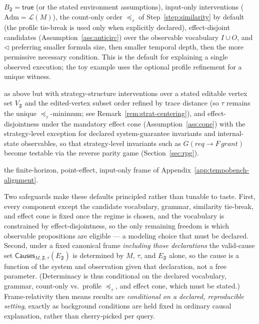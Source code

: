 \documentclass[11pt]{article}
\theoremstyle{remark}
\newcommand{\Lang}{\mathcal{L}}
\newcommand{\True}{\mathsf{true}}
\newcommand{\Frame}{\mathfrak{F}}
\newcommand{\Adm}{\mathrm{Adm}}
\begin{document}
\begin{description}[leftmargin=2.4cm,style=nextline]
  \item[Standard trace causality \(\Frame_{\mathrm{trace}}\)]
  \(B_{\Frame}=\True\) (or the stated environment assumptions), input-only
  interventions (\(\Adm=\Lang(M)\)), the count-only order
  \(\preceq_\tau\) of Step~\ref{step:similarity} by default (the profile tie-break
  is used only when explicitly declared), effect-disjoint candidates
  (Assumption~\ref{ass:anticirc}) over the observable vocabulary \(I\cup O\), and
  \(\triangleleft\) preferring smaller formula size, then smaller temporal depth,
  then the more permissive necessary condition. This is the default for explaining
  a single observed execution; the toy example uses the optional profile refinement
  for a unique witness.
  \item[Standard strategy causality \(\Frame_{\mathrm{strat}}\)]
  as above but with strategy-structure interventions over a stated editable
  vertex set \(V_{\Frame}\) and the edited-vertex subset order refined by trace
  distance (so \(\tau\) remains the unique \(\preceq_\tau\)-minimum; see
  Remark~\ref{rem:strat-centering}), and effect-disjointness under the mandatory
  effect cone (Assumption~\ref{ass:cone}) with the strategy-level exception for
  declared system-guarantee invariants and internal-state observables, so that
  strategy-level invariants
  such as \(G(req\rightarrow F\,grant)\) become testable via the reverse parity
  game (Section~\ref{sec:rpg}).
  \item[TempoBench-style \(\Frame_{\mathrm{TB}}\)]
  the finite-horizon, point-effect, input-only frame of
  Appendix~\ref{app:tempobench-alignment}.
\end{description}

Two safeguards make these defaults principled rather than tunable to taste.
First, every component except the candidate vocabulary, grammar, similarity
tie-break, and effect cone is fixed once the regime
is chosen, and the vocabulary is constrained by effect-disjointness, so the only
remaining freedom is which observable propositions are eligible --- a modeling
choice that must be declared. Second, under a fixed canonical frame \emph{including
those declarations} the valid-cause
set \(\mathsf{Causes}_{M,\Frame,\tau}(E_{\Frame})\) is determined by \(M\),
\(\tau\), and \(E_{\Frame}\) alone, so the cause is a function of the system and
observation given that declaration, not a free parameter. (Determinacy is thus
conditional on the declared vocabulary, grammar, count-only vs.\ profile
\(\preceq_\tau\), and effect cone, which must be stated.) Frame-relativity then means results are
\emph{conditional on a declared, reproducible setting}, exactly as background
conditions are held fixed in ordinary causal explanation, rather than
cherry-picked per query.
\end{document}
